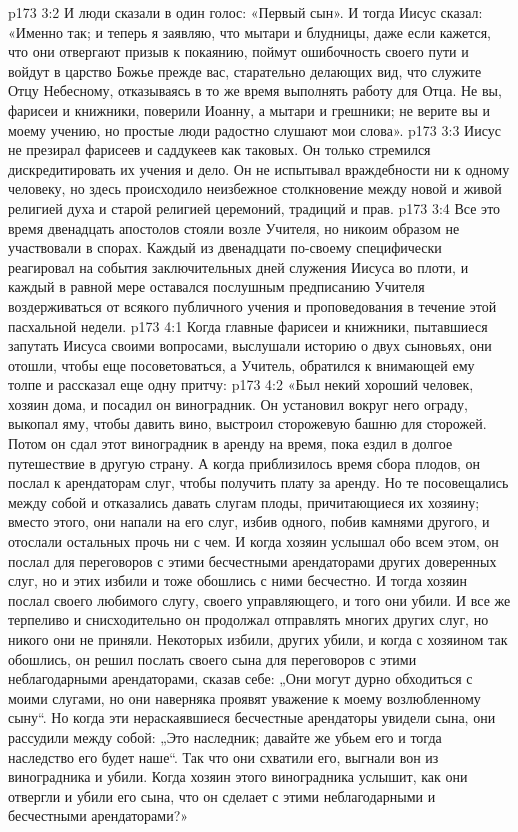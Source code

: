 \vs p173 3:2 И люди сказали в один голос: «Первый сын». И тогда Иисус сказал: «Именно так; и теперь я заявляю, что мытари и блудницы, даже если кажется, что они отвергают призыв к покаянию, поймут ошибочность своего пути и войдут в царство Божье прежде вас, старательно делающих вид, что служите Отцу Небесному, отказываясь в то же время выполнять работу для Отца. Не вы, фарисеи и книжники, поверили Иоанну, а мытари и грешники; не верите вы и моему учению, но простые люди радостно слушают мои слова».
\vs p173 3:3 Иисус не презирал фарисеев и саддукеев как таковых. Он только стремился дискредитировать их учения и дело. Он не испытывал враждебности ни к одному человеку, но здесь происходило неизбежное столкновение между новой и живой религией духа и старой религией церемоний, традиций и прав.
\vs p173 3:4 Все это время двенадцать апостолов стояли возле Учителя, но никоим образом не участвовали в спорах. Каждый из двенадцати по\hyp{}своему специфически реагировал на события заключительных дней служения Иисуса во плоти, и каждый в равной мере оставался послушным предписанию Учителя воздерживаться от всякого публичного учения и проповедования в течение этой пасхальной недели.
\vs p173 4:1 Когда главные фарисеи и книжники, пытавшиеся запутать Иисуса своими вопросами, выслушали историю о двух сыновьях, они отошли, чтобы еще посоветоваться, а Учитель, обратился к внимающей ему толпе и рассказал еще одну притчу:
\vs p173 4:2 \pc «Был некий хороший человек, хозяин дома, и посадил он виноградник. Он установил вокруг него ограду, выкопал яму, чтобы давить вино, выстроил сторожевую башню для сторожей. Потом он сдал этот виноградник в аренду на время, пока ездил в долгое путешествие в другую страну. А когда приблизилось время сбора плодов, он послал к арендаторам слуг, чтобы получить плату за аренду. Но те посовещались между собой и отказались давать слугам плоды, причитающиеся их хозяину; вместо этого, они напали на его слуг, избив одного, побив камнями другого, и отослали остальных прочь ни с чем. И когда хозяин услышал обо всем этом, он послал для переговоров с этими бесчестными арендаторами других доверенных слуг, но и этих избили и тоже обошлись с ними бесчестно. И тогда хозяин послал своего любимого слугу, своего управляющего, и того они убили. И все же терпеливо и снисходительно он продолжал отправлять многих других слуг, но никого они не приняли. Некоторых избили, других убили, и когда с хозяином так обошлись, он решил послать своего сына для переговоров с этими неблагодарными арендаторами, сказав себе: „Они могут дурно обходиться с моими слугами, но они наверняка проявят уважение к моему возлюбленному сыну“. Но когда эти нераскаявшиеся бесчестные арендаторы увидели сына, они рассудили между собой: „Это наследник; давайте же убьем его и тогда наследство его будет наше“. Так что они схватили его, выгнали вон из виноградника и убили. Когда хозяин этого виноградника услышит, как они отвергли и убили его сына, что он сделает с этими неблагодарными и бесчестными арендаторами?»
